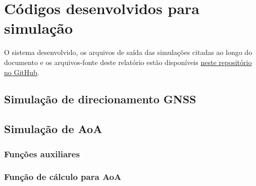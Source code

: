 \chapter{Códigos desenvolvidos para simulação} \label{apdx:codigo}

\lstset{belowskip=\medskipamount}

O sistema desenvolvido, os arquivos de saída das simulações citadas ao longo do documento e os arquivos-fonte deste relatório estão disponíveis \href{https://github.com/HeckRodSav/TG}{\underline{neste repositório no GitHub}}.

\section{Simulação de direcionamento \acs{GNSS}}



\section{Simulação de AoA}

\subsection{Funções auxiliares}











\subsection{Função de cálculo para \acs{AoA}}



